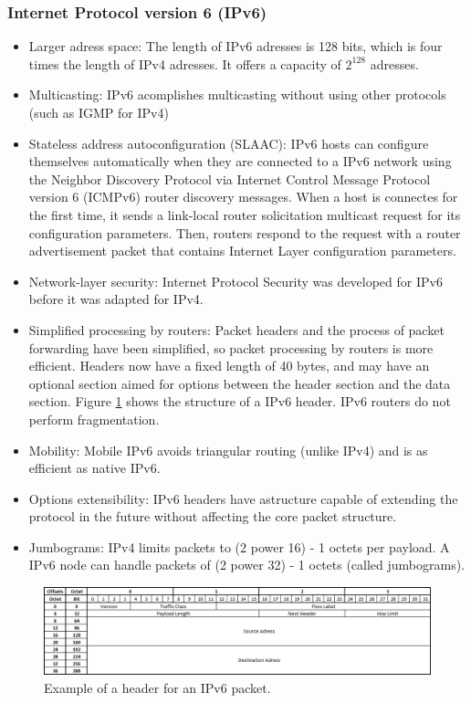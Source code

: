 \subsubsection*{Internet Protocol version 6 (IPv6)\cite{IPv6}}
\begin{itemize}
	\item Larger adress space: The length of IPv6 adresses is 128 bits, which is four times the length of IPv4 adresses. It offers a capacity of $2^{128}$ adresses.
	\item Multicasting: IPv6 acomplishes multicasting without using other protocols (such as IGMP for IPv4)
	\item Stateless address autoconfiguration (SLAAC): IPv6 hosts can configure themselves automatically when they are connected to a IPv6 network using the Neighbor Discovery Protocol via Internet Control Message Protocol version 6 (ICMPv6) router discovery messages. When a host is connectes for the first time, it sends a link-local router solicitation multicast request for its configuration parameters. Then, routers respond to the request with a router advertisement packet that contains Internet Layer configuration parameters.
	\item Network-layer security: Internet Protocol Security was developed for IPv6 before it was adapted for IPv4.
	\item Simplified processing by routers: Packet headers and the process of packet forwarding have been simplified, so packet processing by routers is more efficient. Headers now have a fixed length of 40 bytes, and may have an optional section aimed for options between the header section and the data section. Figure \ref{fig:IPv6header} shows the structure of a IPv6 header. IPv6 routers do not perform fragmentation.
	\item Mobility: Mobile IPv6 avoids triangular routing (unlike IPv4) and is as efficient as native IPv6.
	\item Options extensibility: IPv6 headers have astructure capable of extending the protocol in the future without affecting the core packet structure.
	\item Jumbograms: IPv4 limits packets to (2 power 16) - 1 octets per payload. A IPv6 node can handle packets of (2 power 32) - 1 octets (called jumbograms).
\end{itemize}
\begin{figure}[H]
\begin{center}
\includegraphics[scale=0.6]{IPv6_header.PNG}
\caption[IPv6 header]{Example of a header for an IPv6 packet.}
\label{fig:IPv6header}
\end{center}
\end{figure}

